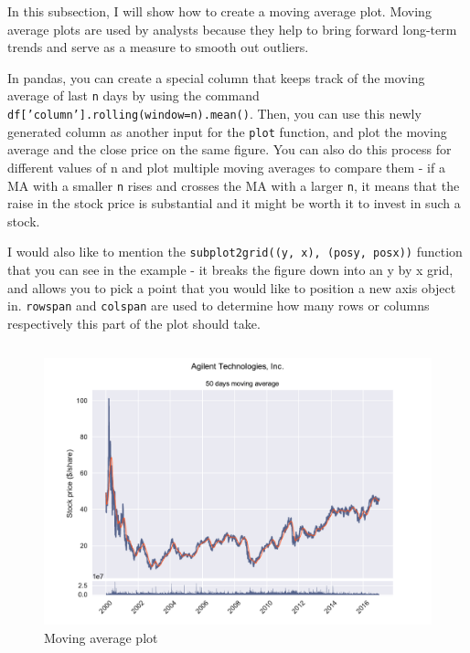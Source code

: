 \documentclass[12pt, a4paper]{article}
\begin{document}
In this subsection, I will show how to create a moving average plot. Moving average plots are used by analysts because they help to bring forward long-term trends and serve as a measure to smooth out outliers.

In pandas, you can create a special column that keeps track of the moving average of last \texttt{n} days by using the command \texttt{df['column'].rolling(window=n).mean()}. Then, you can use this newly generated column as another input for the \texttt{plot} function, and plot the moving average and the close price on the same figure. You can also do this process for different values of n and plot multiple moving averages to compare them - if a MA with a smaller \texttt{n} rises and crosses the MA with a larger \texttt{n}, it means that the raise in the stock price is substantial and it might be worth it to invest in such a stock.

I would also like to mention the \texttt{subplot2grid((y, x), (posy, posx))} function that you can see in the example - it breaks the figure down into an y by x grid, and allows you to pick a point that you would like to position a new axis object in. \texttt{rowspan} and \texttt{colspan} are used to determine how many rows or columns respectively this part of the plot should take.

\bgroup
  \inputminted[linenos, breaklines=true, fontsize=\scriptsize, firstnumber=last]{python}{src/stocks/simple/3_moving_avg.py}
  \label{listing:ssimp_3}
\egroup

\begin{figure}[H]
    \centering
    \includegraphics[width=\textwidth]{src/stocks/simple/movingavg}
    \caption{Moving average plot}
    \label{fig:stock_movingavg}
\end{figure}
\end{document}
